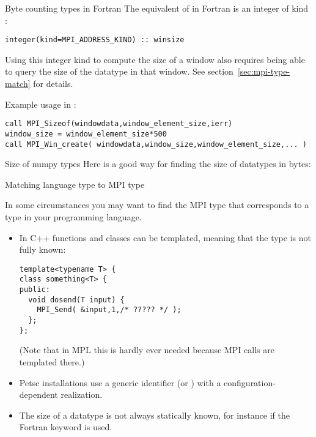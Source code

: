 \begin{fortrannote}{Byte counting types in Fortran}
The equivalent of
 in Fortran
is an integer of kind :
\lstset{language=Fortran} %
\begin{lstlisting}
integer(kind=MPI_ADDRESS_KIND) :: winsize
\end{lstlisting}
\lstset{language=C} %

Using this integer kind to compute the size of a window
also requires being able to query the size of the datatype
in that window.
See section~\ref{sec:mpi-type-match} for details.

Example usage in :
\lstset{language=Fortran} %
\begin{lstlisting}
call MPI_Sizeof(windowdata,window_element_size,ierr)
window_size = window_element_size*500
call MPI_Win_create( windowdata,window_size,window_element_size,... )
\end{lstlisting}
\lstset{language=C} %
\end{fortrannote}

\begin{pythonnote}{Size of numpy types}
  Here is a good way for finding the size of  datatypes
  in bytes:
\end{pythonnote}

 {Matching language type to MPI type}
\label{sec:mpi-type-match}

In some circumstances you may want to find the MPI type
that corresponds to a type in your programming language.
\begin{itemize}
\item In C++ functions and classes can be templated,
  meaning that the type is not fully known:
\begin{lstlisting}
template<typename T> {
class something<T> {
public:
  void dosend(T input) {
    MPI_Send( &input,1,/* ????? */ );
  };
};
\end{lstlisting}
(Note that in \ac{MPL} this is hardly ever needed
because MPI calls are templated there.)
\item Petsc installations use a generic identifier 
  (or )
  with a configuration-dependent realization.
\item The size of a datatype is not always statically known, for instance if
the Fortran  keyword is used.
\end{itemize}

